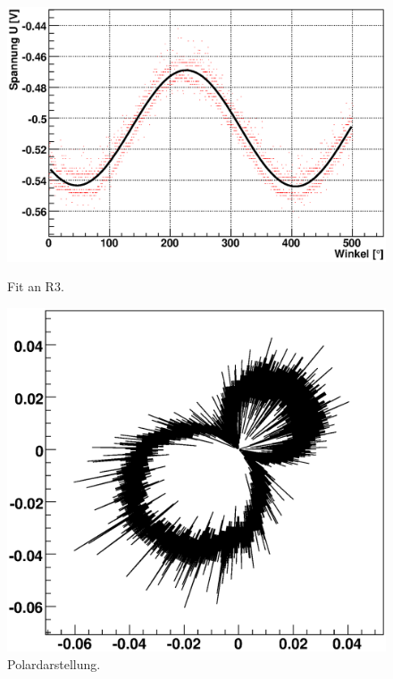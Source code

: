 \documentclass[12pt]{article}
\begin{document}
\begin{figure}[H]  
\begin{minipage}{0.5\linewidth}
\centering
\includegraphics[width=0.9\linewidth]{pictures/R3.eps}
\caption{Fit an R3.}
\end{minipage}
\begin{minipage}{0.5\linewidth}
\centering 
\includegraphics[width=0.9\linewidth]{pictures/R3vd.eps}
\caption{Polardarstellung.}
\end{minipage}
\end{figure}
\end{document}
